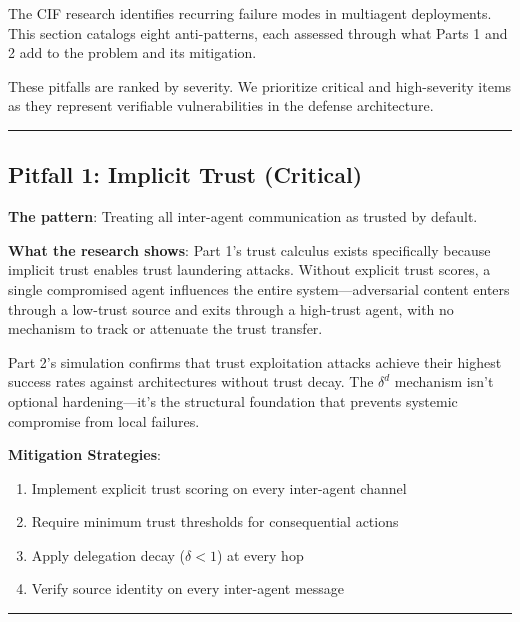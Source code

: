 \documentclass[
]{article}
\providecommand{\tightlist}{%
  \setlength{\itemsep}{0pt}\setlength{\parskip}{0pt}}
\begin{document}
The CIF research identifies recurring failure modes in multiagent
deployments. This section catalogs eight anti-patterns, each assessed
through what Parts 1 and 2 add to the problem and its mitigation.

These pitfalls are ranked by severity. We prioritize critical and
high-severity items as they represent verifiable vulnerabilities in the
defense architecture.

\begin{center}\rule{0.5\linewidth}{0.5pt}\end{center}

\subsection{Pitfall 1: Implicit Trust
(Critical)}\label{pitfall-1-implicit-trust-critical}

\textbf{The pattern}: Treating all inter-agent communication as trusted
by default.

\textbf{What the research shows}: Part 1's trust calculus exists
specifically because implicit trust enables trust laundering attacks.
Without explicit trust scores, a single compromised agent influences the
entire system---adversarial content enters through a low-trust source
and exits through a high-trust agent, with no mechanism to track or
attenuate the trust transfer.

Part 2's simulation confirms that trust exploitation attacks achieve
their highest success rates against architectures without trust decay.
The \(\delta^d\) mechanism isn't optional hardening---it's the
structural foundation that prevents systemic compromise from local
failures.

\textbf{Mitigation Strategies}:

\begin{enumerate}
\def\labelenumi{\arabic{enumi}.}
\tightlist
\item
  Implement explicit trust scoring on every inter-agent channel
\item
  Require minimum trust thresholds for consequential actions
\item
  Apply delegation decay (\(\delta < 1\)) at every hop
\item
  Verify source identity on every inter-agent message
\end{enumerate}

\begin{center}\rule{0.5\linewidth}{0.5pt}\end{center}
\end{document}
